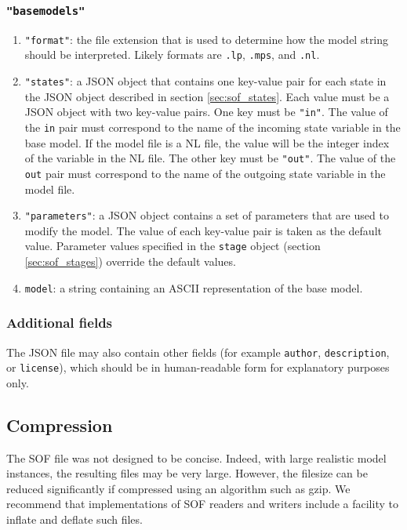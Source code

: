 \documentclass[final,1p,times]{elsarticle}
\begin{document}
\subsubsection{\texttt{"basemodels"}}\label{sec:sof_basemodel}

\begin{enumerate}
    \item \texttt{"format"}: the file extension that is used to determine how the model string should be interpreted. Likely formats are \texttt{.lp}, \texttt{.mps}, and \texttt{.nl}.
    
    \item \texttt{"states"}: a JSON object that contains one key-value pair for each state in the JSON object described in section \ref{sec:sof_states}. Each value must be a JSON object with two key-value pairs. One key must be \texttt{"in"}. The value of the \texttt{in} pair must correspond to the name of the incoming state variable in the base model. If the model file is a NL file, the value will be the integer index of the variable in the NL file. The other key must be \texttt{"out"}. The value of the \texttt{out} pair must correspond to the name of the outgoing state variable in the model file. 
    
    \item \texttt{"parameters"}: a JSON object contains a set of parameters that are used to modify the model. The value of each key-value pair is taken as the default value. Parameter values specified in the \texttt{stage} object (section \ref{sec:sof_stages}) override the default values.
    
    \item \texttt{model}: a string containing an ASCII representation of the base model. 
\end{enumerate}

\subsubsection{Additional fields}

The JSON file may also contain other fields (for example \texttt{author}, \texttt{description}, or \texttt{license}), which should be in human-readable form for explanatory purposes only.


\subsection{Compression}

The SOF file was not designed to be concise. Indeed, with large realistic model instances, the resulting files may be very large. However, the filesize can be reduced significantly if compressed using an algorithm such as gzip. We recommend that implementations of SOF readers and writers include a facility to inflate and deflate such files.
\end{document}
